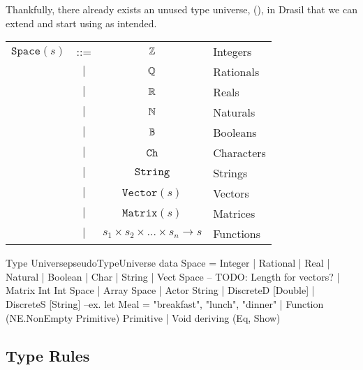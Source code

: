 Thankfully, there already exists an unused type universe, \Space{}
(), in Drasil that we can extend and start
using as intended.

\begin{longtable}{ r c c l}
      \(\texttt{Space}(s)\) & ::=       & \(\mathbb{Z}\)                                                  & Integers   \\
                            & \(\vert\) & \(\mathbb{Q}\)                                                  & Rationals  \\
                            & \(\vert\) & \(\mathbb{R}\)                                                  & Reals      \\
                            & \(\vert\) & \(\mathbb{N}\)                                                  & Naturals   \\
                            & \(\vert\) & \(\mathbb{B}\)                                                  & Booleans   \\
                            & \(\vert\) & \(\texttt{Ch}\)                                             & Characters \\
                            & \(\vert\) & \(\texttt{String}\)                                         & Strings    \\
                            & \(\vert\) & \(\texttt{Vector}(s)\)                                      & Vectors    \\
                            & \(\vert\) & \(\texttt{Matrix}(s)\)                                      & Matrices   \\
                            & \(\vert\) & \(s_1 \times s_2 \times \ldots{} \times s_n \rightarrow s\) & Functions  \\
\end{longtable}

\begin{pseudohaskell}{Type Universe}{pseudoTypeUniverse}
data Space =
    Integer
  | Rational
  | Real
  | Natural
  | Boolean
  | Char
  | String
  | Vect Space -- TODO: Length for vectors?
  | Matrix Int Int Space
  | Array Space
  | Actor String
  | DiscreteD [Double]
  | DiscreteS [String] --ex. let Meal = {"breakfast", "lunch", "dinner"}
  | Function (NE.NonEmpty Primitive) Primitive
  | Void
  deriving (Eq, Show)
\end{pseudohaskell}

\subsection{Type Rules}
\label{chap:typed-expr:sec:typing-the-expression-language:subsec:type-rules}

